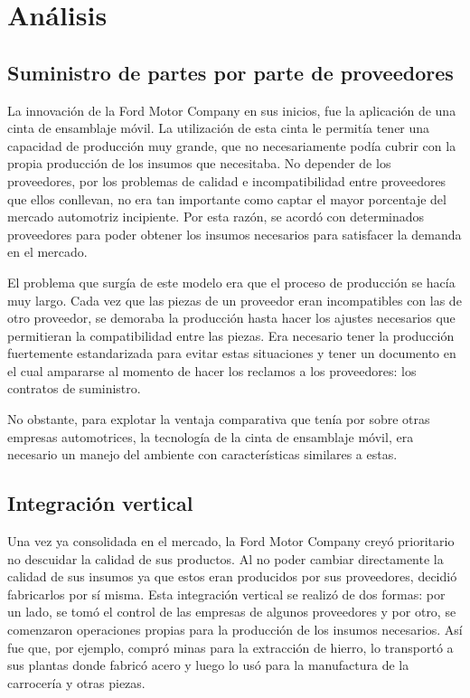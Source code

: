\section{An\'alisis}
	\subsection{Suministro de partes por parte de proveedores}
		La innovaci\'on de la Ford Motor Company en sus inicios, fue la aplicaci\'on de una cinta de ensamblaje m\'ovil.
		La utilizaci\'on de esta cinta le permitía tener una capacidad de producci\'on muy grande, que no necesariamente podía cubrir con la propia producci\'on de los insumos que necesitaba.
		No depender de los proveedores, por los problemas de calidad e incompatibilidad entre proveedores que ellos conllevan, no era tan importante como captar el mayor porcentaje del mercado automotriz incipiente.
		Por esta raz\'on, se acord\'o con determinados proveedores para poder obtener los insumos necesarios para satisfacer la demanda en el mercado.

		El problema que surgía de este modelo era que el proceso de producci\'on se hacía muy largo.
		Cada vez que las piezas de un proveedor eran incompatibles con las de otro proveedor, se demoraba la producci\'on hasta hacer los ajustes necesarios que permitieran la compatibilidad entre las piezas.
		Era necesario tener la producci\'on fuertemente estandarizada para evitar estas situaciones y tener un documento en el cual ampararse al momento de hacer los reclamos a los proveedores: los contratos de suministro.

		No obstante, para explotar la ventaja comparativa que tenía por sobre otras empresas automotrices, la tecnología de la cinta de ensamblaje m\'ovil, era necesario un manejo del ambiente con características similares a estas.

	\subsection{Integraci\'on vertical}
		Una vez ya consolidada en el mercado, la Ford Motor Company crey\'o prioritario no descuidar la calidad de sus productos.
		Al no poder cambiar directamente la calidad de sus insumos ya que estos eran producidos por sus proveedores, decidi\'o fabricarlos por sí misma.
		Esta integraci\'on vertical se realiz\'o de dos formas: por un lado, se tom\'o el control de las empresas de algunos proveedores y por otro, se comenzaron operaciones propias para la producci\'on de los insumos necesarios.
		Así fue que, por ejemplo, compr\'o minas para la extracci\'on de hierro, lo transport\'o a sus plantas donde fabric\'o acero y luego lo us\'o para la manufactura de la carrocería y otras piezas.

